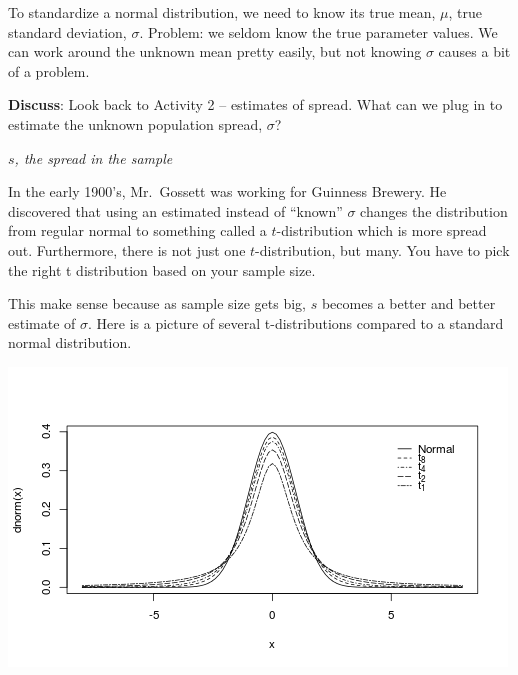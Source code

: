 To standardize a normal distribution,  we need to know its true mean,
$\mu$, true standard deviation, $\sigma$. Problem: we seldom know the
true parameter values.  We can work around the unknown
mean pretty easily, but not knowing $\sigma$ causes a bit of a problem.

{\bf Discuss}: Look back to Activity 2 -- estimates of spread. What
can we plug in to estimate the unknown population spread, $\sigma$? 
\begin{students}
        \vspace{2cm}        
\end{students}

\begin{key}
 {\it $s$, the spread in the sample}
\end{key}

In the early 1900's, Mr.~Gossett was working for Guinness Brewery.  He
discovered that using an estimated instead of ``known'' $\sigma$
changes the distribution from regular normal to something called a
$t$-distribution which is more spread out.  Furthermore, there is not
just one $t$-distribution, but many. You have to pick the right t
distribution based on your sample size.

This make sense because as sample size gets big, $s$ becomes a better
and better estimate of $\sigma$.  Here is a picture of several
t-distributions compared to a standard normal distribution.  

\includegraphics[width=.7\linewidth]{../plots/t-normalDensities.png}

